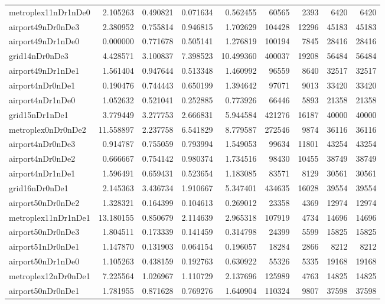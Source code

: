 \documentclass[../../../thesis.tex]{subfiles}
\begin{document}
\begin{longtable}{|l|r|r|r|r|r|r|r|r|}
metroplex11nDr1nDe0 & 2.105263 & 0.490821 & 0.071634 & 0.562455 & 60565 & 2393 & 6420 & 6420 \\
airport49nDr0nDe3 & 2.380952 & 0.755814 & 0.946815 & 1.702629 & 104428 & 12296 & 45183 & 45183 \\
airport49nDr1nDe0 & 0.000000 & 0.771678 & 0.505141 & 1.276819 & 100194 & 7845 & 28416 & 28416 \\
grid14nDr0nDe3 & 4.428571 & 3.100837 & 7.398523 & 10.499360 & 400037 & 19208 & 56484 & 56484 \\
airport49nDr1nDe1 & 1.561404 & 0.947644 & 0.513348 & 1.460992 & 96559 & 8640 & 32517 & 32517 \\
airport4nDr0nDe1 & 0.190476 & 0.744443 & 0.650199 & 1.394642 & 97071 & 9013 & 33420 & 33420 \\
airport4nDr1nDe0 & 1.052632 & 0.521041 & 0.252885 & 0.773926 & 66446 & 5893 & 21358 & 21358 \\
grid15nDr1nDe1 & 3.779449 & 3.277753 & 2.666831 & 5.944584 & 421276 & 16187 & 40000 & 40000 \\
metroplex0nDr0nDe2 & 11.558897 & 2.237758 & 6.541829 & 8.779587 & 272546 & 9874 & 36116 & 36116 \\
airport4nDr0nDe3 & 0.914787 & 0.755059 & 0.793994 & 1.549053 & 99634 & 11801 & 43254 & 43254 \\
airport4nDr0nDe2 & 0.666667 & 0.754142 & 0.980374 & 1.734516 & 98430 & 10455 & 38749 & 38749 \\
airport4nDr1nDe1 & 1.596491 & 0.659431 & 0.523654 & 1.183085 & 83571 & 8129 & 30561 & 30561 \\
grid16nDr0nDe1 & 2.145363 & 3.436734 & 1.910667 & 5.347401 & 434635 & 16028 & 39554 & 39554 \\
airport50nDr0nDe2 & 1.328321 & 0.164399 & 0.104613 & 0.269012 & 23358 & 4369 & 12974 & 12974 \\
metroplex11nDr1nDe1 & 13.180155 & 0.850679 & 2.114639 & 2.965318 & 107919 & 4734 & 14696 & 14696 \\
airport50nDr0nDe3 & 1.804511 & 0.173339 & 0.141459 & 0.314798 & 24399 & 5599 & 15825 & 15825 \\
airport51nDr0nDe1 & 1.147870 & 0.131903 & 0.064154 & 0.196057 & 18284 & 2866 & 8212 & 8212 \\
airport50nDr1nDe0 & 1.105263 & 0.438159 & 0.192763 & 0.630922 & 55326 & 5335 & 19168 & 19168 \\
metroplex12nDr0nDe1 & 7.225564 & 1.026967 & 1.110729 & 2.137696 & 125989 & 4763 & 14825 & 14825 \\
airport50nDr0nDe1 & 1.781955 & 0.871628 & 0.769276 & 1.640904 & 110324 & 9807 & 37598 & 37598 \\

\end{longtable}
\end{document}
